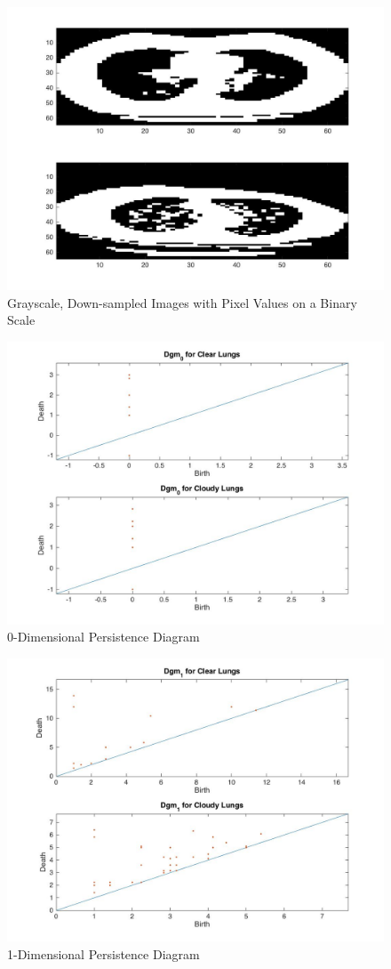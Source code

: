 \documentclass[12pt]{report}
\begin{document}
\begin{figure}[H]
\centering
	\includegraphics[width=0.8\linewidth]{tS2.jpg}
	\caption{Grayscale, Down-sampled Images with Pixel Values on a Binary Scale}
\end{figure}

\begin{figure}[H]
\centering
	\includegraphics[width=0.8\linewidth]{tSdgm0.jpg}
	\caption{0-Dimensional Persistence Diagram}
\end{figure}

\begin{figure}[H]
\centering
	\includegraphics[width=0.8\linewidth]{tSdgm1.jpg}
	\caption{1-Dimensional Persistence Diagram}
\end{figure}
\end{document}
